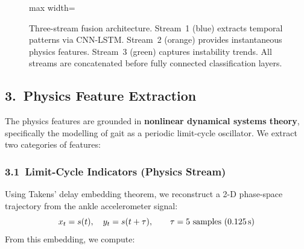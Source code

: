 \documentclass[12pt,a4paper]{article}
\begin{document}
\begin{figure}[ht]
\begin{adjustbox}{max width=\textwidth}
\end{adjustbox}
\caption{Three-stream fusion architecture. Stream~1 (blue) extracts temporal patterns via
CNN-LSTM. Stream~2 (orange) provides instantaneous physics features. Stream~3 (green) captures
instability trends. All streams are concatenated before fully connected classification layers.}
\label{fig:architecture}
\end{figure}

\subsection*{3.\ Physics Feature Extraction}

The physics features are grounded in \textbf{nonlinear dynamical systems theory}, specifically the
modelling of gait as a periodic limit-cycle oscillator. We extract two categories of features:

\subsubsection*{3.1\ Limit-Cycle Indicators (Physics Stream)}

Using Takens' delay embedding theorem, we reconstruct a 2-D phase-space trajectory from the
ankle accelerometer signal:
\begin{equation}
  x_t = s(t),\quad y_t = s(t+\tau), \qquad \tau = 5 \text{ samples (0.125\,s)}
\end{equation}
From this embedding, we compute:
\end{document}
